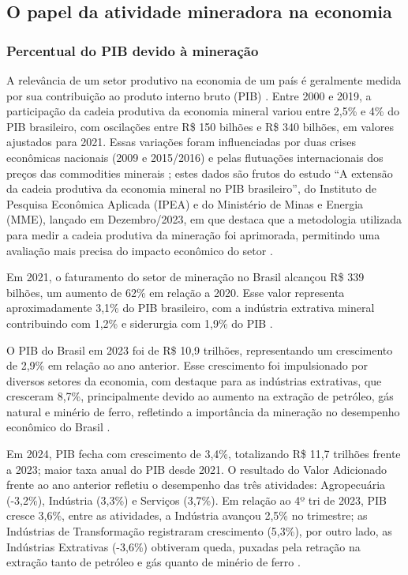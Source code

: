 \subsection{O papel da atividade mineradora na economia}
\label{subsec:papel_mineracao_economia}

\subsubsection{Percentual do PIB devido à mineração}
\label{subsubsec:percentual_pib}

A relevância de um setor produtivo na economia de um país é geralmente medida por sua contribuição ao produto interno bruto (PIB) \cite{leao2023extensao}. Entre 2000 e 2019, a participação da cadeia produtiva da economia mineral variou entre 2,5\% e 4\% do PIB brasileiro, com oscilações entre R\$ 150 bilhões e R\$ 340 bilhões, em valores ajustados para 2021. Essas variações foram influenciadas por duas crises econômicas nacionais (2009 e 2015/2016) e pelas flutuações internacionais dos preços das commodities minerais \cite{ipea2023comunicacao}; estes dados são frutos do estudo ``A extensão da cadeia produtiva da economia mineral no PIB brasileiro'', do Instituto de Pesquisa Econômica Aplicada (IPEA) e do Ministério de Minas e Energia (MME), lançado em Dezembro/2023, em que destaca que a metodologia utilizada para medir a cadeia produtiva da mineração foi aprimorada, permitindo uma avaliação mais precisa do impacto econômico do setor \cite{leao2023extensao}.

Em 2021, o faturamento do setor de mineração no Brasil alcançou R\$ 339 bilhões, um aumento de 62\% em relação a 2020. Esse valor representa aproximadamente 3,1\% do PIB brasileiro, com a indústria extrativa mineral contribuindo com 1,2\% e siderurgia com 1,9\% do PIB \cite{apc2024industria}.

O PIB do Brasil em 2023 foi de R\$ 10,9 trilhões, representando um crescimento de 2,9\% em relação ao ano anterior. Esse crescimento foi impulsionado por diversos setores da economia, com destaque para as indústrias extrativas, que cresceram 8,7\%, principalmente devido ao aumento na extração de petróleo, gás natural e minério de ferro, refletindo a importância da mineração no desempenho econômico do Brasil \cite{ibge2024pib}.

Em 2024, PIB fecha com crescimento de 3,4\%, totalizando R\$ 11,7 trilhões frente a 2023; maior taxa anual do PIB desde 2021. O resultado do Valor Adicionado frente ao ano anterior refletiu o desempenho das três atividades: Agropecuária (-3,2\%), Indústria (3,3\%) e Serviços (3,7\%). Em relação ao 4º tri de 2023, PIB cresce 3,6\%, entre as atividades, a Indústria avançou 2,5\% no trimestre; as Indústrias de Transformação registraram crescimento (5,3\%), por outro lado, as
Indústrias Extrativas (-3,6\%) obtiveram queda, puxadas pela retração na extração tanto de petróleo e gás quanto de minério de ferro \cite{ibge2025pib}.

